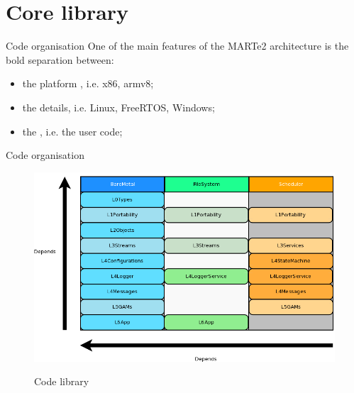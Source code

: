 
\section{Core library}
\graphicspath{{figs/section2/}}

\begin{frame}{Code organisation}
	One of the main features of the MARTe2 architecture is the bold separation between:
	\begin{itemize}
		\item<1-> the platform , i.e. x86, armv8;
		\item<2-> the  details, i.e. Linux, FreeRTOS, Windows;
		\item<3-> the , i.e. the user code;
	\end{itemize}
\end{frame}

\begin{frame}{Code organisation}
	\begin{figure}
		\centering
		\includegraphics[scale=.35]{Tiers.png}
		\label{fig:tiers}
		\caption{Code library}
	\end{figure}
\end{frame}

